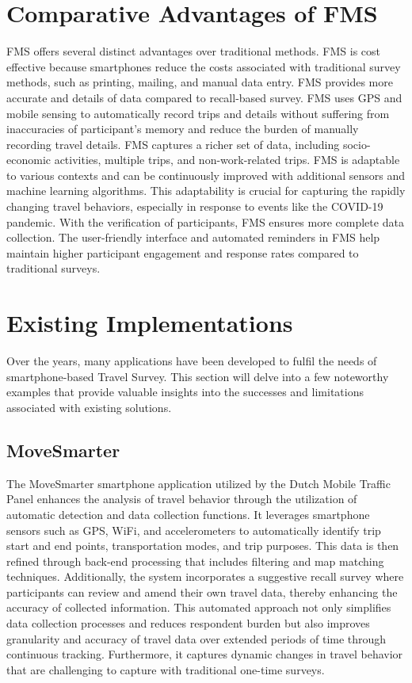 \documentclass[12pt,two side]{report}
\begin{document}
\section{Comparative Advantages of FMS}
FMS offers several distinct advantages over traditional methods. FMS is cost effective because smartphones reduce the costs associated with traditional survey methods, such as printing, mailing, and manual data entry\cite{hong2021insights}. FMS provides more accurate and details of data compared to recall-based survey. FMS uses GPS and mobile sensing to automatically record trips and details without suffering from inaccuracies of participant's memory and reduce the burden of manually recording travel details\cite{cottrill2013future}\cite{hong2021insights}. FMS captures a richer set of data, including socio-economic activities, multiple trips, and non-work-related trips\cite{hong2021insights}\cite{cottrill2013future}.  FMS is adaptable to various contexts and can be continuously improved with additional sensors and machine learning algorithms. This adaptability is crucial for capturing the rapidly changing travel behaviors, especially in response to events like the COVID-19 pandemic\cite{hong2021insights}. With the verification of participants, FMS ensures more complete data collection\cite{hong2021insights}\cite{cottrill2013future}. The user-friendly interface and automated reminders in FMS help maintain higher participant engagement and response rates compared to traditional surveys\cite{hong2021insights}. 
\section{Existing Implementations}
Over the years, many applications have been developed to fulfil the needs of smartphone-based Travel Survey. This section will delve into a few noteworthy examples that provide valuable insights into the successes and limitations associated with existing solutions.
\subsection{MoveSmarter}
The MoveSmarter smartphone application utilized by the Dutch Mobile Traffic Panel enhances the analysis of travel behavior through the utilization of automatic detection and data collection functions. It leverages smartphone sensors such as GPS, WiFi, and accelerometers to automatically identify trip start and end points, transportation modes, and trip purposes. This data is then refined through back-end processing that includes filtering and map matching techniques\cite{geurs2015automatic}. Additionally, the system incorporates a suggestive recall survey where participants can review and amend their own travel data, thereby enhancing the accuracy of collected information. This automated approach not only simplifies data collection processes and reduces respondent burden but also improves granularity and accuracy of travel data over extended periods of time through continuous tracking. Furthermore, it captures dynamic changes in travel behavior\cite{geurs2015automatic} that are challenging to capture with traditional one-time surveys.\newline
\end{document}
